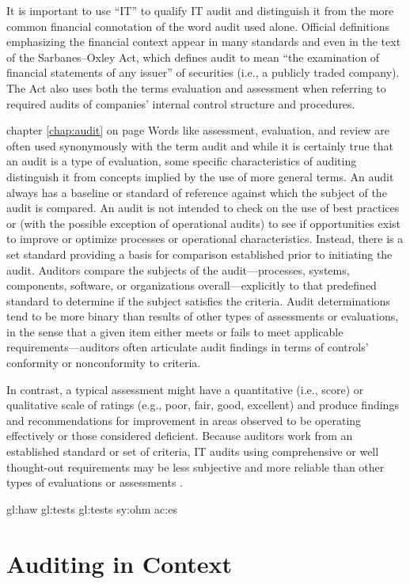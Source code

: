 It is important to use “IT” to qualify IT audit and distinguish it from the more common financial connotation of the word audit used alone. Official definitions emphasizing the financial context appear in many standards and even in the text of the Sarbanes–Oxley Act, which defines audit to mean “the examination of financial statements of any issuer” of securities (i.e., a publicly traded company). The Act also uses both the terms evaluation and assessment when referring to required audits of companies’ internal control structure and procedures.

chapter \ref{chap:audit} on page \pageref{chap:audit} Words like assessment, evaluation, and review are often used synonymously with the term audit and while it is certainly true that an audit is a type of
evaluation, some specific characteristics of auditing distinguish it from concepts
implied by the use of more general terms. An audit always has a baseline or standard of reference against which the subject of the audit is compared. An audit is not
intended to check on the use of best practices or (with the possible exception of
operational audits) to see if opportunities exist to improve or optimize processes
or operational characteristics. Instead, there is a set standard providing a basis for
comparison established prior to initiating the audit. Auditors compare the subjects of the audit—processes, systems, components, software, or organizations
overall—explicitly to that predefined standard to determine if the subject satisfies the criteria. Audit determinations tend to be more binary than results of other
types of assessments or evaluations, in the sense that a given item either meets or
fails to meet applicable requirements—auditors often articulate audit findings in
terms of controls’ conformity or nonconformity to criteria.

In contrast, a typical assessment might have a quantitative (i.e., score) or qualitative scale of ratings (e.g., poor, fair, good,
excellent) and produce findings and recommendations for improvement in areas
observed to be operating effectively or those considered deficient. Because auditors
work from an established standard or set of criteria, IT audits using comprehensive or well thought-out requirements may be less subjective and more reliable than
other types of evaluations or assessments \citep{GANTZ20141}.

\gls{gl:haw}
\glspl{gl:test}
\Glspl{gl:test}
\gls{sy:ohm}
\gls{ac:es}

\section{Auditing in Context}

